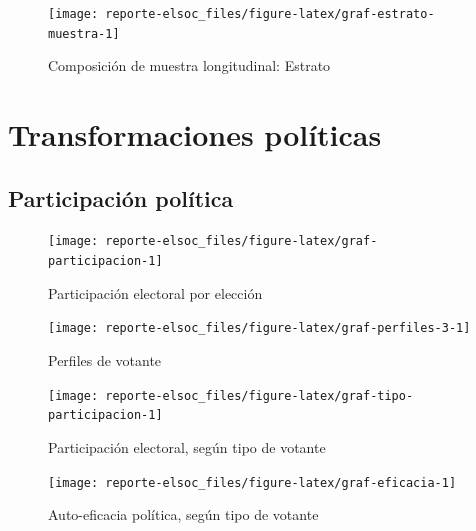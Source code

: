 \documentclass[
  12pt,
]{book}
\begin{document}
\begin{figure}

{\centering \texttt{[image: reporte-elsoc\_files/figure-latex/graf-estrato-muestra-1]} 

}

\caption{Composición de muestra longitudinal: Estrato}\label{fig:graf-estrato-muestra}
\end{figure}

\hypertarget{transformaciones-poluxedticas}{%
\chapter{Transformaciones políticas}\label{transformaciones-poluxedticas}}

\hypertarget{participaciuxf3n-poluxedtica}{%
\section{Participación política}\label{participaciuxf3n-poluxedtica}}

\begin{figure}

{\centering \texttt{[image: reporte-elsoc\_files/figure-latex/graf-participacion-1]} 

}

\caption{Participación electoral por elección}\label{fig:graf-participacion}
\end{figure}

\begin{figure}

{\centering \texttt{[image: reporte-elsoc\_files/figure-latex/graf-perfiles-3-1]} 

}

\caption{Perfiles de votante}\label{fig:graf-perfiles-3}
\end{figure}

\begin{figure}

{\centering \texttt{[image: reporte-elsoc\_files/figure-latex/graf-tipo-participacion-1]} 

}

\caption{Participación electoral, según tipo de votante}\label{fig:graf-tipo-participacion}
\end{figure}

\begin{figure}

{\centering \texttt{[image: reporte-elsoc\_files/figure-latex/graf-eficacia-1]} 

}

\caption{Auto-eficacia política, según tipo de votante}\label{fig:graf-eficacia}
\end{figure}
\end{document}
